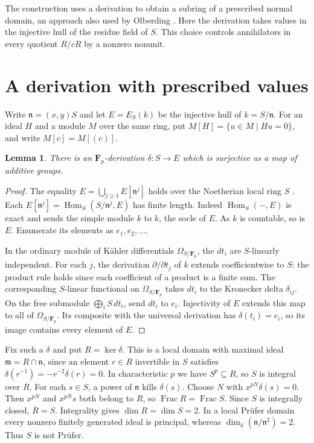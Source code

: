 \documentclass[11pt,reqno]{amsart}
\newtheorem{lemma}[theorem]{Lemma}
\DeclareMathOperator{\Frac}{Frac}
\DeclareMathOperator{\Hom}{Hom}
\newcommand{\F}{\mathbf F}
\newcommand{\m}{\mathfrak m}
\newcommand{\n}{\mathfrak n}
\begin{document}
The construction uses a derivation to obtain a subring of a prescribed
normal domain, an approach also used by Olberding \cite{Olberding}.
Here the derivation takes values in the injective hull of the residue field
of \(S\). This choice controls annihilators in every quotient \(R/cR\)
by a nonzero nonunit.

\section{A derivation with prescribed values}

Write \(\n=(x,y)S\) and let \(E=E_S(k)\) be the injective hull of \(k=S/\n\).
For an ideal \(H\) and a module \(M\) over the same ring, put
\(M[H]=\{u\in M\mid Hu=0\}\), and write \(M[c]=M[(c)]\).

\begin{lemma}\label{lem:derivation}
There is an \(\F_p\)-derivation \(\delta:S\to E\) which is surjective as a map
of additive groups.
\end{lemma}

\begin{proof}
The equality \(E=\bigcup_{j\ge1}E[\n^j]\) holds over the Noetherian local ring
\(S\) \cite[Lemma~47.7.3]{Stacks}. Each
\(E[\n^j]=\Hom_S(S/\n^j,E)\) has finite length. Indeed \(\Hom_S(-,E)\) is
exact and sends the simple module \(k\) to \(k\), the socle of \(E\).
As \(k\) is countable, so is \(E\). Enumerate its elements as \(e_1,e_2,\ldots\).

In the ordinary module of K\"ahler differentials \(\Omega_{S/\F_p}\), the
\(dt_i\) are \(S\)-linearly independent. For each \(j\), the derivation
\(\partial/\partial t_j\) of \(k\) extends coefficientwise to \(S\):
the product rule holds since each coefficient of a product is a finite sum.
The corresponding \(S\)-linear functional on \(\Omega_{S/\F_p}\) takes \(dt_i\)
to the Kronecker delta \(\delta_{ij}\). On the free submodule
\(\bigoplus_i S\,dt_i\), send \(dt_i\) to \(e_i\). Injectivity of \(E\)
extends this map to all of \(\Omega_{S/\F_p}\). Its composite with the
universal derivation has \(\delta(t_i)=e_i\), so its image contains every
element of \(E\).
\end{proof}

Fix such a \(\delta\) and put \(R=\ker\delta\). This is a local domain with
maximal ideal \(\m=R\cap\n\), since an element \(r\in R\) invertible in \(S\)
satisfies \(\delta(r^{-1})=-r^{-2}\delta(r)=0\).
In characteristic \(p\) we have \(S^p\subseteq R\), so \(S\) is integral
over \(R\). For each \(s\in S\), a power of \(\n\) kills \(\delta(s)\).
Choose \(N\) with \(x^{pN}\delta(s)=0\). Then \(x^{pN}\) and \(x^{pN}s\)
both belong to \(R\), so \(\Frac R=\Frac S\). Since \(S\) is integrally
closed, \(\overline R=S\). Integrality gives \(\dim R=\dim S=2\).
In a local Pr\"ufer domain every nonzero finitely generated ideal is
principal, whereas \(\dim_k(\n/\n^2)=2\). Thus \(S\) is not Pr\"ufer.
\end{document}
